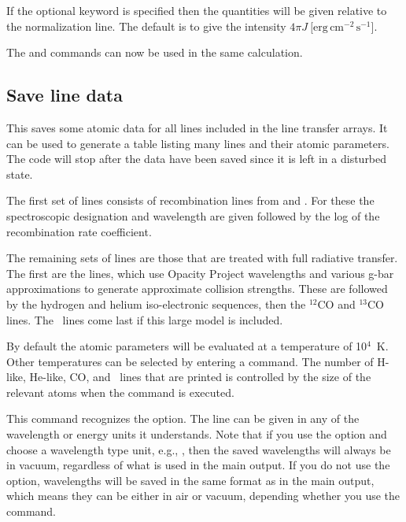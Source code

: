 If the optional keyword  is specified then the quantities will
be given relative to the normalization line. The default is to give
the intensity $4\pi J\ [\mathrm{erg\, cm}^{-2}\,\mathrm{s}^{-1}$].

The  and  commands can now be used in the same calculation.

\subsection{Save line data}
\label{sec:SaveLineData}


This saves some atomic data for all lines included in the line transfer
arrays.  It can be used to generate a table listing many lines and their
atomic parameters.
The code will stop after the data have been saved since
it is left in a disturbed state.

The first set of lines consists of recombination lines from \citet{Nussbaumer1984} and \citet{Pequignot1991}.  For these
the spectroscopic designation and wavelength are given followed by the log
of the recombination rate coefficient.

The remaining sets of lines are those that are treated with full radiative
transfer.
The first are the  lines, which use Opacity Project
wavelengths and various g-bar approximations to generate approximate
collision strengths.   These are followed by the
hydrogen and helium iso-electronic sequences, then the $^{12}$CO and $^{13}$CO lines.
The \htwo\ lines come last if this large model is included.

By default the atomic parameters will be evaluated at a temperature of
10$^4$~K.  Other temperatures can be selected by entering a
 command.
The number of H-like, He-like, CO,
and \htwo\ lines that are printed is controlled by the size of the
relevant atoms when the  command is executed.

This command recognizes the  option.
The line
can be given in any of the wavelength or energy units
it understands.
Note that if you use the  option
and choose a wavelength type unit, e.g., , then the saved
wavelengths will always be in vacuum, regardless of what is used in the main
output. If you do not use the  option, wavelengths will be
saved in the same format as in the main output, which means they can be either
in air or vacuum, depending whether you use the 
command.

